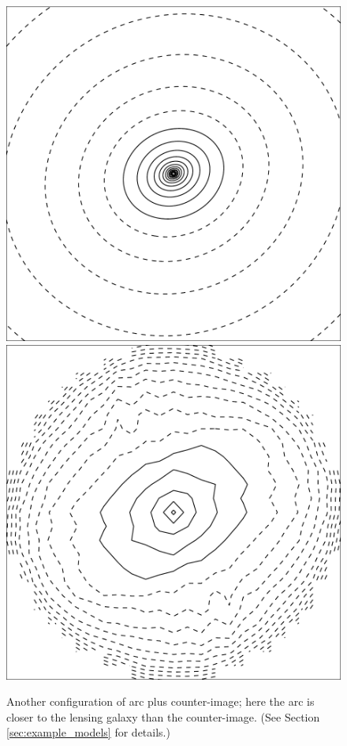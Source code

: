 \begin{figure}
  \includegraphics[width=\myplotswidth]{fig/ASW0002z6f_006919_kappa}
  \includegraphics[width=\myplotswidth]{fig/006919_mass}

  \caption[result 6919 (ASW0002z6f)]{Another configuration of arc plus
    counter-image; here the arc is closer to the lensing galaxy than
    the counter-image. (See Section \ref{sec:example_models} for
    details.)}
  \label{fig:6919}
\end{figure}



